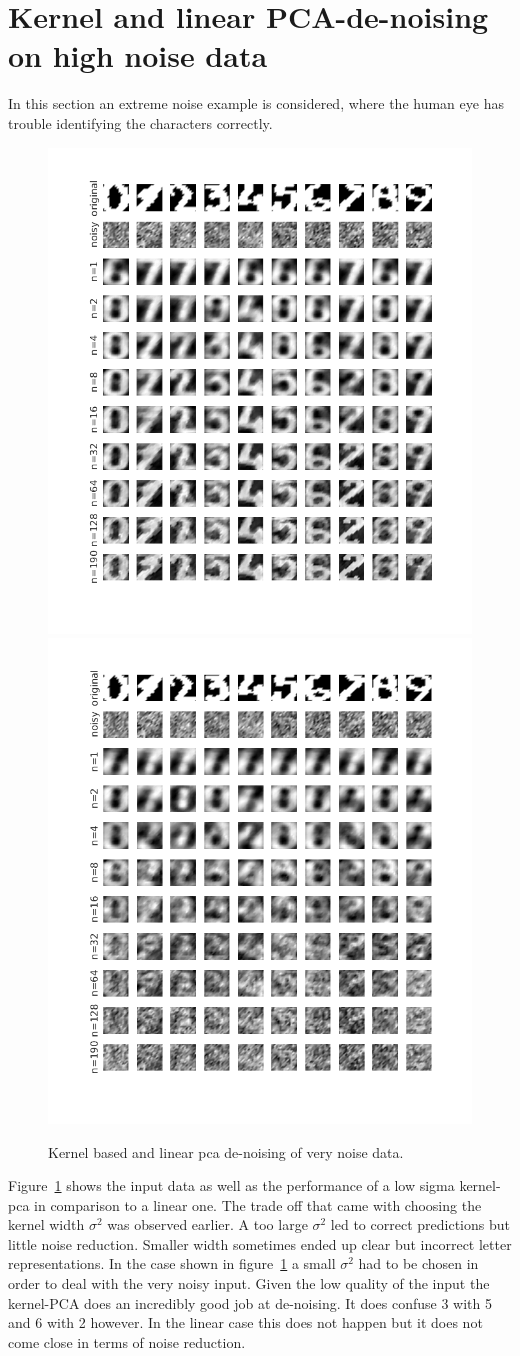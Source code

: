 \section{Kernel and linear PCA-de-noising on high noise data}
In this section an extreme noise example is considered, where the human eye has trouble identifying the characters correctly.
\begin{figure}
\centering
\includegraphics[width=0.45\linewidth]{../src/figure/lotsofNoiseKernel}
\includegraphics[width=0.45\linewidth]{../src/figure/lotsofNoiseLinear}
\caption{Kernel based and linear pca de-noising of very noise data.}
\label{fig:lotsofNoise}
\end{figure}
Figure~\ref{fig:lotsofNoise} shows the input data as well as the performance of a low sigma kernel-pca in comparison
to a linear one. The trade off that came with choosing the kernel width $\sigma^2$ was observed earlier. A too large $\sigma^2$
led to correct predictions but little noise reduction. Smaller width sometimes ended up clear but incorrect letter representations.
In the case shown in figure~\ref{fig:lotsofNoise} a small $\sigma^2$ had to be chosen in order to deal with the very noisy input.
Given the low quality of the input the kernel-PCA does an incredibly good job at de-noising. It does confuse 3 with 5 and 6 with 2
however. In the linear case this does not happen but it does not come close in terms of noise reduction. 

